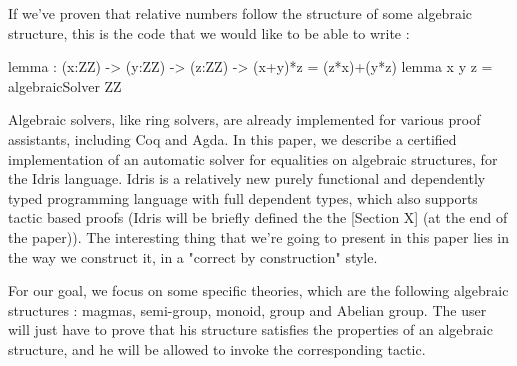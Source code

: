 If we've proven that relative numbers follow the structure of some algebraic structure, this is the code that we would like to be able to write :

\begin{code}[caption=Code we'd like to write, captionpos=b, label=lst1:haskell2]
lemma : (x:ZZ) -> (y:ZZ) -> (z:ZZ) 
        -> (x+y)*z = (z*x)+(y*z)
lemma x y z = algebraicSolver ZZ
\end{code}

Algebraic solvers, like ring solvers, are already implemented for various proof assistants, including Coq and Agda. In this paper, we describe a certified implementation of an automatic solver for equalities on algebraic structures, for the Idris language. Idris is a relatively new purely functional and dependently typed programming language with full dependent types, which also supports tactic based proofs  (Idris will be briefly defined the the [Section X] (at the end of the paper)). The interesting thing that we're going to present in this paper lies in the way we construct it, in a "correct by construction" style.

For our goal, we focus on some specific theories, which are the following algebraic structures : magmas, semi-group, monoid, group and Abelian group.
The user will just have to prove that his structure satisfies the properties of an algebraic structure, and he will be allowed to invoke the corresponding tactic.

